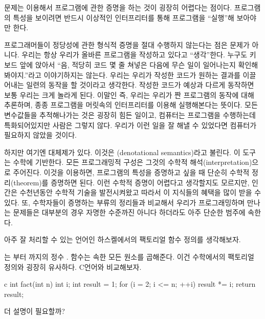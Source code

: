 문제는 \trOperationalSemantics\를 이용해서 프로그램에 관한 증명을 하는 것이 굉장히 어렵다는 점이다. 프로그램의 특성을 보이려면 반드시 이상적인 인터프리터를 통해 프로그램을 ``실행''해 보아야만 한다.

프로그래머들이 정당성에 관한 형식적 증명을 절대 수행하지 않는다는 점은 문제가 아니다. 우리는 항상 우리가 올바른 프로그램을 작성하고 있다고 ``생각''한다.
누구도 키보드 앞에 앉아서 ``음, 적당히 코드 몇 줄 쳐넣은 다음에 무슨 일이 일어나는지 확인해봐야지.''라고 이야기하지는 않는다.
우리는 우리가 작성한 코드가 원하는 결과를 이끌어내는 일련의 동작을 할 것이라고 생각한다. 작성한 코드가 예상과 다르게 동작하면 보통 우리는 크게 놀라게 된다.
이말인 즉, 우리는 우리가 짠 프로그램의 동작에 대해 추론하며, 종종 프로그램을 머릿속의 인터프리터를 이용해 실행해본다는 뜻이다.
모든 변수값들을 추적해나가는 것은 굉장히 힘든 일이고, 컴퓨터는 프로그램을 수행하는데 특화되어있지만 사람은 그렇지 않다.
우리가 이런 일을 잘 해낼 수 있었다면 컴퓨터가 필요하지 않았을 것이다.

하지만 여기엔 대체제가 있다. 이것은 \newterm{\trDenotationalSemantics}(denotational semantics)라고 불린다. 이 도구는 수학에 기반한다.
 모든 프로그래밍적 구성은 그것의 수학적 해석(interpretation)으로 주어진다.
이것을 이용하면, 프로그램의 특성을 증명하고 싶을 때 단순히 수학적 정리(theorem)를 증명하면 된다.
이런 수학적 증명이 어렵다고 생각할지도 모르지만, 인간은 수천년동안 수학적 기술을 발전시켜왔고 따라서 이 지식들의 혜택을 많이 받을 수 있다.
또, 수학자들이 증명하는 부류의 정리들과 비교해서 우리가 프로그래밍하며 만나는 문제들은 대부분의 경우 자명한 수준까진 아니다 하더라도 아주 단순한 범주에 속한다.

 아주 잘 처리할 수 있는 언어인 하스켈에서의 팩토리얼 함수 정의를 생각해보자. 


\trExpression \code{{[}1..n{]}} 는  부터 까지의 정수 \trList{}.   함수는  속한 모든 원소를 곱해준다. 이건 수학에서의 팩토리얼 정의와 굉장히 유사하다. C언어와 비교해보자.

\begin{snip}{c}
int fact(int n) {
    int i;
    int result = 1;
    for (i = 2; i <= n; ++i)
        result *= i;
    return result;
}
\end{snip}

더 설명이 필요할까?

